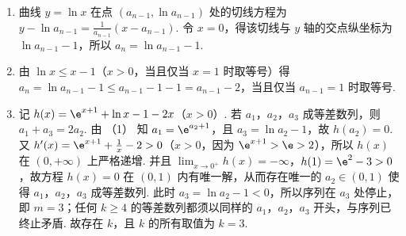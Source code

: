 \begin{solution}
\begin{enumerate}
\item 曲线 \(y=\ln x\) 在点 \(\left(a_{n-1},\ln a_{n-1}\right)\) 处的切线方程为 \(y-\ln a_{n-1}=\frac1{a_{n-1}}\left(x-a_{n-1}\right)\). 令 \(x=0\)，得该切线与 \(y\) 轴的交点纵坐标为 \(\ln a_{n-1}-1\)，所以 \(a_n=\ln a_{n-1}-1\).

\item 由 \(\ln x\le x-1\)（\(x>0\)，当且仅当 \(x=1\) 时取等号）得 \(a_n=\ln a_{n-1}-1\le a_{n-1}-1-1=a_{n-1}-2\)，当且仅当 \(a_{n-1}=1\) 时取等号.

\item 记 \(h(x)=\e^{x+1}+\ln x-1-2x\)（\(x>0\)）. 若 \(a_1\)，\(a_2\)，\(a_3\) 成等差数列，则 \(a_1+a_3=2a_2\). 由 （1） 知 \(a_1=\e^{a_2+1}\)，且 \(a_3=\ln a_2-1\)，故 \(h(a_2)=0\). 又 \(h^{\prime}(x)=\e^{x+1}+\frac1x-2>0\)（\(x>0\)，因为 \(\e^{x+1}>\e>2\)），所以 \(h(x)\) 在 \((0,+\infty)\) 上严格递增. 并且 \(\displaystyle\lim_{x\to 0^+}h(x)=-\infty\)，\(h(1)=\e^2-3>0\)，故方程 \(h(x)=0\) 在 \((0,1)\) 内有唯一解，从而存在唯一的 \(a_2\in(0,1)\) 使得 \(a_1\)，\(a_2\)，\(a_3\) 成等差数列. 此时 \(a_3=\ln a_2-1<0\)，所以序列在 \(a_3\) 处停止，即 \(m=3\)；任何 \(k\ge 4\) 的等差数列都须以同样的 \(a_1\)，\(a_2\)，\(a_3\) 开头，与序列已终止矛盾. 故存在 \(k\)，且 \(k\) 的所有取值为 \(k=3\).
\end{enumerate}
\end{solution}
